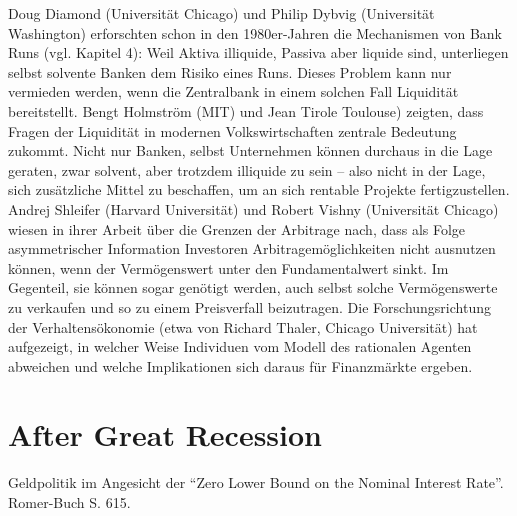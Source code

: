Doug
Diamond (Universität Chicago) und Philip Dybvig (Universität Washington) erforschten
schon in den 1980er-Jahren die Mechanismen von Bank Runs (vgl. Kapitel 4): Weil
Aktiva illiquide, Passiva aber liquide sind, unterliegen selbst solvente Banken dem
Risiko eines Runs. Dieses Problem kann nur vermieden werden, wenn die Zentralbank
in einem solchen Fall Liquidität bereitstellt. Bengt Holmström (MIT) und Jean Tirole
Toulouse) zeigten, dass Fragen der Liquidität in modernen Volkswirtschaften zentrale
Bedeutung zukommt. Nicht nur Banken, selbst Unternehmen können durchaus in die
Lage geraten, zwar solvent, aber trotzdem illiquide zu sein – also nicht in der Lage, sich
zusätzliche Mittel zu beschaffen, um an sich rentable Projekte fertigzustellen. Andrej
Shleifer (Harvard Universität) und Robert Vishny (Universität Chicago) wiesen in ihrer
Arbeit über die Grenzen der Arbitrage nach, dass als Folge asymmetrischer Information
Investoren Arbitragemöglichkeiten nicht ausnutzen können, wenn der Vermögenswert
unter den Fundamentalwert sinkt. Im Gegenteil, sie können sogar genötigt werden, auch
selbst solche Vermögenswerte zu verkaufen und so zu einem Preisverfall beizutragen.
Die Forschungsrichtung der Verhaltensökonomie (etwa von Richard Thaler, Chicago
Universität) hat aufgezeigt, in welcher Weise Individuen vom Modell des rationalen
Agenten abweichen und welche Implikationen sich daraus für Finanzmärkte ergeben.





\section{After Great Recession}

Geldpolitik im Angesicht der "`Zero Lower Bound on the Nominal Interest Rate"'. Romer-Buch S. 615.









